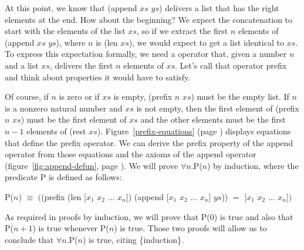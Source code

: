 At this point, we know that (append $xs$ $ys$) delivers
a list that has the right elements at the end.
How about the beginning?
We expect the concatenation to start with the elements of the list $xs$,
so if we extract the first $n$ elements of (append $xs$ $ys$), where $n$ is (len $xs$),
we would expect to get a list identical to $xs$.
To express this expectation formally, we need a operator that,
given a number $n$ and a list $xs$, delivers the first $n$ elements of $xs$.
Let's call that operator \textsf{prefix} and think about properties it would have to satisfy.

Of course, if $n$ is zero or if $xs$ is empty,
\textsf{(prefix $n$ $xs$)} must be the empty list.
If $n$ is a nonzero natural number and $xs$ is not empty,
then the first element of \textsf{(prefix $n$ $xs$)} must be the first element of $xs$
and the other elements must be the first $n-1$ elements of (rest $xs$).
Figure~\ref{prefix-equations} (page \pageref{prefix-equations}) displays
equations that define the \textsf{prefix} operator.
We can derive the prefix property of the \textsf{append} operator
from those equations and the axioms of the \textsf{append} operator
(figure~\ref{fig:append-defun}, page \pageref{fig:append-defun}).
We will prove $\forall n.$P($n$) by induction,
where the predicate P is defined as follows:
\begin{center}
P($n$) $\equiv$ $($\textsf{(prefix (len [$x_1$ $x_2$ $\dots$ $x_n$]) (append [$x_1$ $x_2$ $\dots$ $x_n$] $ys$))}
                $=$ \textsf{[$x_1$ $x_2$ $\dots$ $x_n$]}$)$
\end{center}

As required in proofs by induction, we will prove that P(0) is true
and also that P($n+1$) is true whenever P($n$) is true.
Those two proofs will allow us to conclude that
$\forall n.$P($n$) is true, citing \{induction\}.

